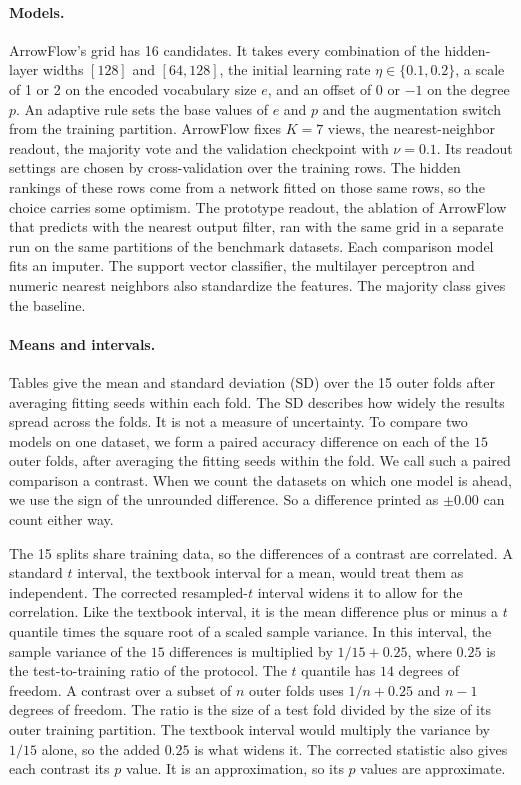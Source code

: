 \paragraph{Models.} ArrowFlow's grid has 16 candidates. It takes every combination of the hidden-layer widths $[128]$ and $[64,128]$, the initial learning rate $\eta\in\{0.1,0.2\}$, a scale of 1 or 2 on the encoded vocabulary size $e$, and an offset of $0$ or $-1$ on the degree $p$. An adaptive rule sets the base values of $e$ and $p$ and the augmentation switch from the training partition. ArrowFlow fixes $K=7$ views, the nearest-neighbor readout, the majority vote and the validation checkpoint with $\nu=0.1$. Its readout settings are chosen by cross-validation over the training rows. The hidden rankings of these rows come from a network fitted on those same rows, so the choice carries some optimism. The prototype readout, the ablation of ArrowFlow that predicts with the nearest output filter, ran with the same grid in a separate run on the same partitions of the benchmark datasets. Each comparison model fits an imputer. The support vector classifier, the multilayer perceptron and numeric nearest neighbors also standardize the features. The majority class gives the baseline.

\paragraph{Means and intervals.} Tables give the mean and standard deviation (SD) over the 15 outer folds after averaging fitting seeds within each fold. The SD describes how widely the results spread across the folds. It is not a measure of uncertainty. To compare two models on one dataset, we form a paired accuracy difference on each of the $15$ outer folds, after averaging the fitting seeds within the fold. We call such a paired comparison a contrast. When we count the datasets on which one model is ahead, we use the sign of the unrounded difference. So a difference printed as $\pm0.00$ can count either way.

The 15 splits share training data, so the differences of a contrast are correlated. A standard $t$ interval, the textbook interval for a mean, would treat them as independent. The corrected resampled-$t$ interval \citep{nadeau2003inference,bouckaert2004evaluating} widens it to allow for the correlation. Like the textbook interval, it is the mean difference plus or minus a $t$ quantile times the square root of a scaled sample variance. In this interval, the sample variance of the $15$ differences is multiplied by $1/15+0.25$, where $0.25$ is the test-to-training ratio of the protocol. The $t$ quantile has $14$ degrees of freedom. A contrast over a subset of $n$ outer folds uses $1/n+0.25$ and $n-1$ degrees of freedom. The ratio is the size of a test fold divided by the size of its outer training partition. The textbook interval would multiply the variance by $1/15$ alone, so the added $0.25$ is what widens it. The corrected statistic also gives each contrast its $p$ value. It is an approximation, so its $p$ values are approximate.

